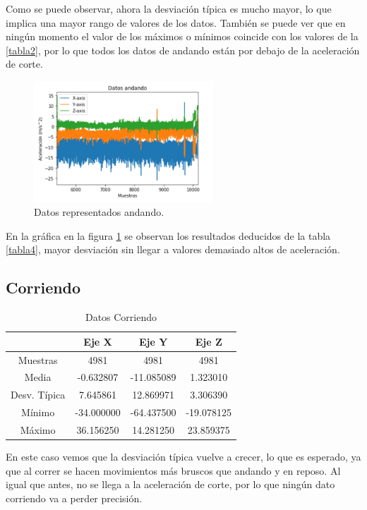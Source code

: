 \documentclass[12pt]{book}
\numberwithin{equation}{section}
\begin{document}
Como se puede observar, ahora la desviación típica es mucho mayor, lo que implica una mayor rango de valores de los datos. También se puede ver que en ningún momento el valor de los máximos o mínimos coincide con los valores de la \ref{tabla2}, por lo que todos los datos de andando están por debajo de la aceleración de corte.

\begin{figure}[h]
    \centering
    \includegraphics[width=0.6\textwidth]{andandodatos.png}
    \caption{Datos representados andando.}
    \label{fig:andandodatos}
\end{figure}

En la gráfica en la figura \ref{tabla5} se observan los resultados deducidos de la tabla \ref{tabla4}, mayor desviación sin llegar a valores demasiado altos de aceleración.

\newpage
\subsection{Corriendo}

\begin{table}[h]
\centering
\caption{Datos Corriendo}
\begin{tabular}{| c | c | c | c |}
\hline
 & Eje X & Eje Y & Eje Z \\
\hline
Muestras & 4981 & 4981 & 4981 \\
\hline
Media & -0.632807 & -11.085089 & 1.323010 \\
\hline
Desv. Típica & 7.645861 & 12.869971 & 3.306390 \\
\hline
Mínimo & -34.000000 & -64.437500 & -19.078125 \\
\hline
Máximo & 36.156250 & 14.281250 & 23.859375 \\
\hline
\end{tabular}
\label{tabla5}
\end{table}

En este caso vemos que la desviación típica vuelve a crecer, lo que es esperado, ya que al correr se hacen movimientos más bruscos que andando y en reposo. Al igual que antes, no se llega a la aceleración de corte, por lo que ningún dato corriendo va a perder precisión.
\end{document}
